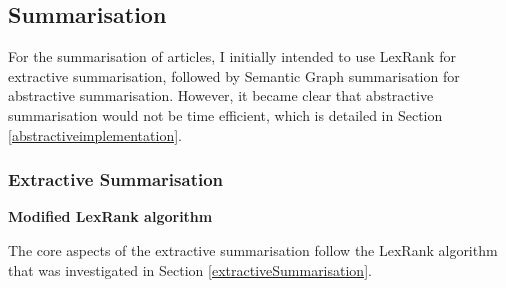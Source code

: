 \documentclass[12pt]{article}
\begin{document}
\subsection{Summarisation}

For the summarisation of articles, I initially intended to use LexRank for extractive summarisation, followed by Semantic Graph summarisation for abstractive summarisation. However, it became clear that abstractive summarisation would not be time efficient, which is detailed in Section \ref{abstractiveimplementation}.

\subsubsection{Extractive Summarisation}

\label{extractiveimplementation}

\textbf{Modified LexRank algorithm}

The core aspects of the extractive summarisation follow the LexRank algorithm that was investigated in Section \ref{extractiveSummarisation}. 
\end{document}

